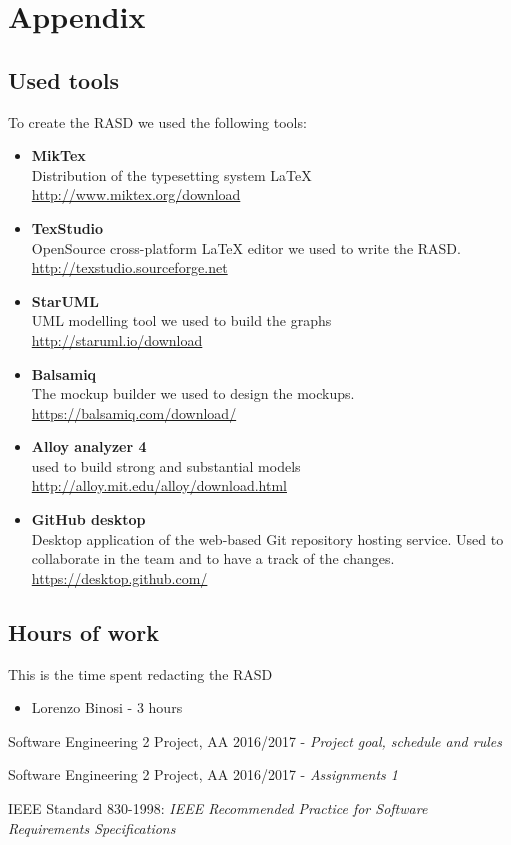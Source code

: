 \section{Appendix}
\subsection{Used tools}
To create the RASD we used the following tools:
\begin{itemize}
	\item \textbf{MikTex} \\ Distribution of the typesetting system LaTeX \\ \url{http://www.miktex.org/download } 
	\item \textbf{TexStudio}\\ OpenSource cross-platform LaTeX editor we used to write the RASD. \\ \url{http://texstudio.sourceforge.net  } 
	\item \textbf{StarUML}\\ UML modelling tool we used to build the graphs\\ \url{http://staruml.io/download } 
	\item \textbf{Balsamiq}\\ The mockup builder we used to design the mockups. \\ \url{https://balsamiq.com/download/ } 
	\item \textbf{Alloy analyzer 4}\\ used to build  strong and substantial models \\ \url{ http://alloy.mit.edu/alloy/download.html }
	\item \textbf{GitHub desktop}\\ Desktop application of the web-based Git repository hosting service. Used to collaborate in the team and to have a track of the changes.  \\ \url{https://desktop.github.com/ } 
\end{itemize}


\subsection{Hours of work}
This is the time spent redacting the RASD
\begin{itemize}
	\item {Lorenzo Binosi} - 3 hours
\end{itemize}

\begin{thebibliography}{1}	
	Software Engineering 2 Project, AA 2016/2017 - \emph{Project goal, schedule and rules}
	
	Software Engineering 2 Project, AA 2016/2017 - \emph{Assignments 1}
	
	IEEE Standard 830-1998: \emph{IEEE Recommended Practice for Software Requirements Specifications}
\end{thebibliography}